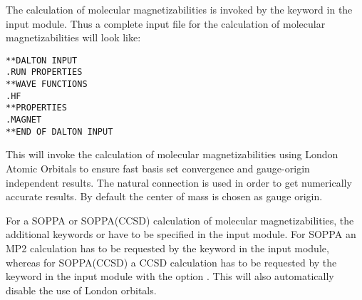 \begin{center}
\end{center}

The calculation of molecular magnetizabilities
is invoked by the
keyword  in the  input module. Thus
a complete input file for the calculation of molecular
magnetizabilities will look like:

\begin{verbatim}
**DALTON INPUT
.RUN PROPERTIES
**WAVE FUNCTIONS
.HF
**PROPERTIES
.MAGNET
**END OF DALTON INPUT
\end{verbatim}

This will invoke the calculation of molecular magnetizabilities using
London Atomic Orbitals to ensure fast basis set
convergence and
gauge-origin independent results. The natural
connection
\cite{joklbkrthpjtca90} is used in order to get numerically accurate
results. By default the center of mass is chosen
as gauge origin.

For a SOPPA or SOPPA(CCSD) calculation of
molecular magnetizabilities, the additional keywords  or
 have to be specified in the  input
module. For SOPPA an MP2 calculation has to be requested by the keyword
 in the  input module, whereas for SOPPA(CCSD) a
CCSD calculation has to be requested by the keyword  in the  input module with the  option
. This will also automatically disable the use of London
orbitals. 

